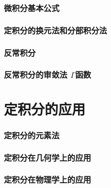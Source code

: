 \documentclass{article}
\begin{document}
  \section{微积分基本公式}
    
  \section{定积分的换元法和分部积分法}
    
  \section{反常积分}
    
  \section[反常积分的审敛法 Γ函数]{反常积分的审敛法 $\Gamma$函数}
    

  \newpage
  \part{定积分的应用}
  \section{定积分的元素法}
    
  \section{定积分在几何学上的应用}
    
  \section{定积分在物理学上的应用}
    
\end{document}
